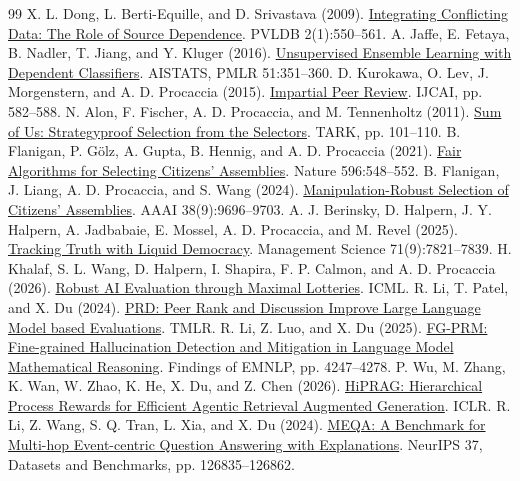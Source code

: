 \documentclass[11pt,letterpaper]{article}
\begin{document}
\begin{thebibliography}{99}
 X. L. Dong, L. Berti-Equille, and D. Srivastava (2009). \href{https://doi.org/10.14778/1687627.1687689}{Integrating Conflicting Data: The Role of Source Dependence}. PVLDB 2(1):550--561.
 A. Jaffe, E. Fetaya, B. Nadler, T. Jiang, and Y. Kluger (2016). \href{https://proceedings.mlr.press/v51/jaffe16.html}{Unsupervised Ensemble Learning with Dependent Classifiers}. AISTATS, PMLR 51:351--360.
 D. Kurokawa, O. Lev, J. Morgenstern, and A. D. Procaccia (2015). \href{https://procaccia.info/wp-content/uploads/2020/03/impartial.pdf}{Impartial Peer Review}. IJCAI, pp. 582--588.
 N. Alon, F. Fischer, A. D. Procaccia, and M. Tennenholtz (2011). \href{https://doi.org/10.1145/2000378.2000390}{Sum of Us: Strategyproof Selection from the Selectors}. TARK, pp. 101--110.
 B. Flanigan, P. G\"olz, A. Gupta, B. Hennig, and A. D. Procaccia (2021). \href{https://doi.org/10.1038/s41586-021-03788-6}{Fair Algorithms for Selecting Citizens' Assemblies}. Nature 596:548--552.
 B. Flanigan, J. Liang, A. D. Procaccia, and S. Wang (2024). \href{https://procaccia.info/wp-content/uploads/2023/08/sortmanip.pdf}{Manipulation-Robust Selection of Citizens' Assemblies}. AAAI 38(9):9696--9703.
 A. J. Berinsky, D. Halpern, J. Y. Halpern, A. Jadbabaie, E. Mossel, A. D. Procaccia, and M. Revel (2025). \href{https://doi.org/10.1287/mnsc.2023.02470}{Tracking Truth with Liquid Democracy}. Management Science 71(9):7821--7839.
 H. Khalaf, S. L. Wang, D. Halpern, I. Shapira, F. P. Calmon, and A. D. Procaccia (2026). \href{https://arxiv.org/abs/2602.21297}{Robust AI Evaluation through Maximal Lotteries}. ICML.
 R. Li, T. Patel, and X. Du (2024). \href{https://openreview.net/forum?id=YVD1QqWRaj}{PRD: Peer Rank and Discussion Improve Large Language Model based Evaluations}. TMLR.
 R. Li, Z. Luo, and X. Du (2025). \href{https://aclanthology.org/2025.findings-emnlp.228/}{FG-PRM: Fine-grained Hallucination Detection and Mitigation in Language Model Mathematical Reasoning}. Findings of EMNLP, pp. 4247--4278.
 P. Wu, M. Zhang, K. Wan, W. Zhao, K. He, X. Du, and Z. Chen (2026). \href{https://proceedings.iclr.cc/paper_files/paper/2026/hash/85255cf8f2d2318cc7cffd0b1bc66625-Abstract-Conference.html}{HiPRAG: Hierarchical Process Rewards for Efficient Agentic Retrieval Augmented Generation}. ICLR.
 R. Li, Z. Wang, S. Q. Tran, L. Xia, and X. Du (2024). \href{https://proceedings.neurips.cc/paper_files/paper/2024/hash/e560a0b22e4432003d0dba63ff8dc457-Abstract.html}{MEQA: A Benchmark for Multi-hop Event-centric Question Answering with Explanations}. NeurIPS 37, Datasets and Benchmarks, pp. 126835--126862.

\end{thebibliography}
\end{document}
